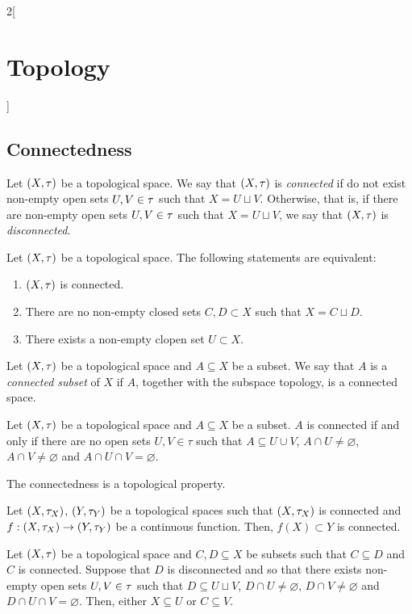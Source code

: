 \documentclass[../../../main.tex]{subfiles}
\begin{document}
\begin{multicols}{2}[\section{Topology}]
  \subsection{Connectedness}
  \begin{definition}
    Let $(X,\tau)$ be a topological space. We say that $(X,\tau)$ is \textit{connected} if do not exist non-empty open sets $U,V\in\tau$ such that $X=U\sqcup V$. Otherwise, that is, if there are non-empty open sets $U,V\in\tau$ such that $X=U\sqcup V$, we say that $(X,\tau)$ is \textit{disconnected}.
  \end{definition}
  \begin{prop}
    Let $(X,\tau)$ be a topological space. The following statements are equivalent:
    \begin{enumerate}
      \item $(X,\tau)$ is connected.
      \item There are no non-empty closed sets $C,D\subset X$ such that $X=C\sqcup D$.
      \item There exists a non-empty clopen set $U\subset X$.
    \end{enumerate}
  \end{prop}
  \begin{definition}
    Let $(X,\tau)$ be a topological space and $A\subseteq X$ be a subset. We say that $A$ is a \textit{connected subset} of $X$ if $A$, together with the subspace topology, is a connected space.
  \end{definition}
  \begin{prop}
    Let $(X,\tau)$ be a topological space and $A\subseteq X$ be a subset. $A$ is connected if and only if there are no open sets $U,V\in \tau$ such that $A\subseteq U\cup V$, $A\cap U\ne\varnothing$, $A\cap V\ne\varnothing$ and $A\cap U\cap V=\varnothing$.
  \end{prop}
  \begin{prop}
    The connectedness is a topological property.
  \end{prop}
  \begin{theorem}
    Let $(X,\tau_X)$, $(Y,\tau_Y)$ be a topological spaces such that $(X,\tau_X)$ is connected and $f:(X,\tau_X)\rightarrow(Y,\tau_Y)$ be a continuous function. Then, $f(X)\subset Y$ is connected.
  \end{theorem}
  \begin{lemma}
    Let $(X,\tau)$ be a topological space and $C,D\subseteq X$ be subsets such that $C\subseteq D$ and $C$ is connected. Suppose that $D$ is disconnected and so that there exists non-empty open sets $U,V\in\tau$ such that $D\subseteq U\sqcup V$, $D\cap U\ne\varnothing$, $D\cap V\ne\varnothing$ and $D\cap U\cap V=\varnothing$. Then, either $X\subseteq U$ or $C\subseteq V$.

\end{lemma}
\end{multicols}
\end{document}

